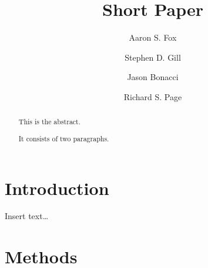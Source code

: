 \documentclass[]{elsarticle} %
\begin{document}
\begin{frontmatter}

  \title{Short Paper}
    \author[Centre for Sports Research,Barwon Centre for Orthopaedic
Research and Education (B-CORE)]{Aaron S. Fox}
  
    \author[Barwon Centre for Orthopaedic Research and Education
(B-CORE),School of Medicine,Orthopaedic Department]{Stephen D. Gill}
  
    \author[Centre for Sports Research]{Jason Bonacci}
  
    \author[Barwon Centre for Orthopaedic Research and Education
(B-CORE),School of Medicine,Orthopaedic Department]{Richard S. Page}
  
      \address[Centre for Sports Research]{Centre for Sports Research,
School of Exercise and Nutrition Sciences, Deakin University, Geelong,
Australia}
    \address[Barwon Centre for Orthopaedic Research and Education
(B-CORE)]{Barwon Centre for Orthopaedic Research and Education (B-CORE),
Barwon Health, St John of Jod Hospital and Deakin University, Geelong,
Australia}
    \address[School of Medicine]{School of Medicine, Deakin University,
Geelong, Australia}
    \address[Orthopaedic Department]{Orthopaedic Department, University
Hospital Geelong, Barwon Health, Geelong, Australia}
  
  \begin{abstract}
  This is the abstract.

  It consists of two paragraphs.
  \end{abstract}
  
 \end{frontmatter}

\hypertarget{introduction}{%
\section{Introduction}\label{introduction}}

Insert text\ldots{}

\hypertarget{methods}{%
\section{Methods}\label{methods}}
\end{document}
